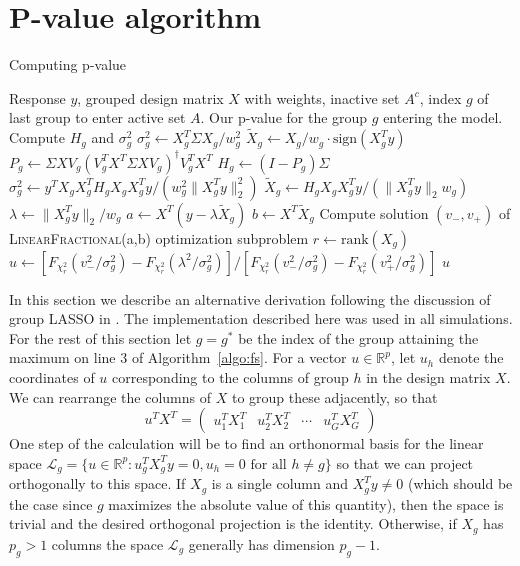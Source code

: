 \documentclass{imsart}
\newcommand{\real}{\mathbb{R}}
\newcommand{\norm}[1]{\lVert #1 \rVert}
\newcommand{\vecsp}{\mathcal{L}}
\newcommand{\gstar}{g^*}
\begin{document}
\newpage


%


\newpage

\appendix
\section{P-value algorithm}
\label{app:algo}

\begin{algorithm}
 \caption{Computing p-value}
 \label{algo:pval}
 \begin{algorithmic}
   \REQUIRE Response $y$, grouped design matrix $X$ with weights, inactive set $A^c$, index $g$ of last group to enter active set $A$.
   \ENSURE Our p-value for the group $g$ entering the model.
   \STATE Compute $H_g$ and $\sigma^2_g$
   \STATE $\sigma_g^2 \gets X_g^T\Sigma X_g/w_g^2$
   \STATE $\tilde X_g \gets X_g / w_g \cdot \text{sign}(X_g^Ty)$
   \ELSE
   \STATE $P_g \gets \Sigma XV_g (V_g^T X^T \Sigma X V_g)^\dagger V_g^TX^T$
   \STATE $H_g \gets (I - P_g)\Sigma$
   \STATE $\sigma^2_g \gets y^TX_gX_g^T H_g X_gX_g^Ty / (w_g^2 \norm{X_g^Ty}_2^2)$
   \STATE $\tilde X_g \gets H_g X_g X_g^T y /(\norm{X_g^Ty}_2 w_g)$
   \ENDIF
   \STATE $\lambda \gets \norm{X_g^Ty}_2/w_g$
   \STATE {}
   \STATE $a \gets X^T(y - \lambda \tilde X_g)$
   \STATE $b \gets X^T \tilde X_g$
   \STATE Compute solution $(v_-, v_+)$ of \textsc{LinearFractional}(a,b) optimization subproblem
   \STATE $r \gets \text{rank}(X_g)$
   \STATE $u \gets [F_{\chi^2_r}(v^2_-/\sigma_g^2) - F_{\chi^2_r}(\lambda^2/\sigma_g^2)]/[F_{\chi^2_r}(v^2_-/\sigma_g^2) - F_{\chi^2_r}(v^2_+/\sigma_g^2)]$
   \RETURN $u$
 \end{algorithmic}
\end{algorithm}

In this section we describe an alternative derivation following the
discussion of group LASSO in \cite{tests:adaptive}. The implementation
described here was used in all simulations.
For the rest of this section let $g = \gstar$ be the index of
the group attaining the maximum on line 3 of Algorithm~\ref{algo:fs}.
For a vector $u \in \real^p$, let $u_h$ denote the coordinates
of $u$ corresponding to the columns of group $h$ in the design matrix $X$.
We can rearrange the columns of $X$ to group these adjacently, so that
\[
u^TX^T = \begin{pmatrix} u_1^T X_1^T & u_2^T X_2^T & \cdots & u_G^TX_G^T \end{pmatrix}
\]
One step of the calculation will be to find an orthonormal basis for the
linear space $\vecsp_g = \{ u \in \real^p : u_g^T X_g^T y = 0, u_h = 0
\text{ for all } h \neq g \}$ so that we can project orthogonally to
this space. If $X_g$ is a single column and $X_g^Ty \neq 0$ (which
should be the case since $g$ maximizes the absolute value of this
quantity), then the
space is trivial and the desired orthogonal projection is the identity.
Otherwise, if $X_g$ has $p_g > 1$ columns the space $\vecsp_g$
generally has dimension $p_g-1$.
\end{document}

